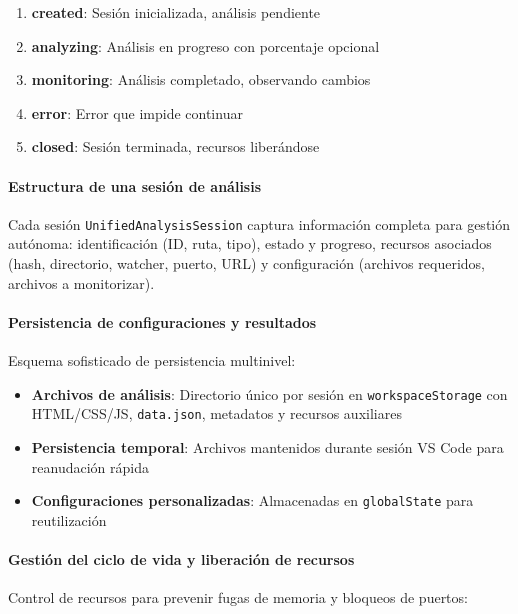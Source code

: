 \documentclass[a4paper, 12pt]{book}
\begin{document}
\begin{enumerate}
  \item \textbf{created}: Sesión inicializada, análisis pendiente
  \item \textbf{analyzing}: Análisis en progreso con porcentaje opcional
  \item \textbf{monitoring}: Análisis completado, observando cambios
  \item \textbf{error}: Error que impide continuar
  \item \textbf{closed}: Sesión terminada, recursos liberándose
\end{enumerate}


\paragraph{Estructura de una sesión de análisis}
Cada sesión \texttt{UnifiedAnalysisSession} captura información completa para gestión autónoma: identificación (ID, ruta, tipo), estado y progreso, recursos asociados (hash, directorio, watcher, puerto, URL) y configuración (archivos requeridos, archivos a monitorizar).

\paragraph{Persistencia de configuraciones y resultados}
Esquema sofisticado de persistencia multinivel:

\begin{itemize}
  \item \textbf{Archivos de análisis}: Directorio único por sesión en \texttt{workspaceStorage} con HTML/CSS/JS, \texttt{data.json}, metadatos y recursos auxiliares
  \item \textbf{Persistencia temporal}: Archivos mantenidos durante sesión VS Code para reanudación rápida
  \item \textbf{Configuraciones personalizadas}: Almacenadas en \texttt{globalState} para reutilización
\end{itemize}


\paragraph{Gestión del ciclo de vida y liberación de recursos}
Control de recursos para prevenir fugas de memoria y bloqueos de puertos:
\end{document}
